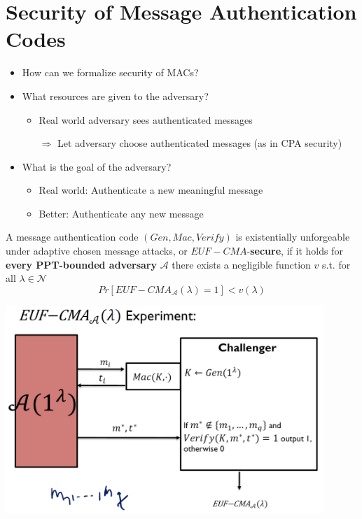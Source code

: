 \section{Security of Message Authentication Codes}
	\begin{itemize}
		\item How can we formalize security of MACs?
		\item What resources are given to the adversary?
		\begin{itemize}
			\item Real world adversary sees authenticated messages
			\item[$\Rightarrow$] Let adversary choose authenticated messages (as in CPA security)
		\end{itemize}
		\item What is the goal of the adversary?
		\begin{itemize}
			\item Real world: Authenticate a new meaningful message
			\item Better: Authenticate any new message
		\end{itemize}
	\end{itemize}
	
	\begin{definition}
		A message authentication code $(Gen,Mac,Verify)$ is existentially unforgeable under adaptive chosen message attacks, or $EUF-CMA$-\textbf{secure}, 
		if it holds for \textbf{every PPT-bounded adversary} $\mathcal{A}$ there exists a negligible function $v$ s.t. for all $\lambda \in \mathcal{N}$
		$$Pr[EUF-CMA_{\mathcal{A}}(\lambda) = 1] < v(\lambda)$$
	\end{definition}
	\begin{center}
		\includegraphics[width=120mm]{Graphics/Authentication/a3.png}\\
	\end{center}

